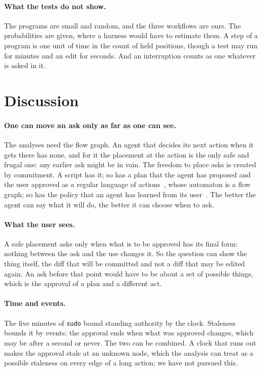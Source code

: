 \documentclass[acmsmall,nonacm,screen]{acmart}
\begin{document}
\paragraph{What the tests do not show.} The programs are small and random, and the three
workflows are ours. The probabilities are given, where a harness would have to estimate
them. A step of a program is one unit of time in the count of held positions, though a test
may run for minutes and an edit for seconds. And an interruption counts as one whatever is
asked in it.

\section{Discussion}
\label{sec:discussion}

\paragraph{One can move an ask only as far as one can see.} The analyses need the flow
graph. An agent that decides its next action when it gets there has none, and for it the
placement at the action is the only safe and frugal one: any earlier ask might be in vain.
The freedom to place asks is created by commitment. A script has it; so has a plan that the
agent has proposed and the user approved as a regular language of actions~\cite{tpp11}, whose
automaton is a flow graph; so has the policy that an agent has learned from its
user~\cite{tpp16}. The better the agent can say what it will do, the better it can choose
when to ask.

\paragraph{What the user sees.} A safe placement asks only when what is to be approved has
its final form: nothing between the ask and the use changes it. So the question can show
the thing itself, the diff that will be committed and not a diff that may be edited again.
An ask before that point would have to be about a set of possible things, which is the
approval of a plan and a different act.

\paragraph{Time and events.} The five minutes of \texttt{sudo} bound standing authority by
the clock. Staleness bounds it by events: the approval ends when what was approved changes,
which may be after a second or never. The two can be combined. A clock that runs out makes
the approval stale at an unknown node, which the analysis can treat as a possible staleness
on every edge of a long action; we have not pursued this.
\end{document}
